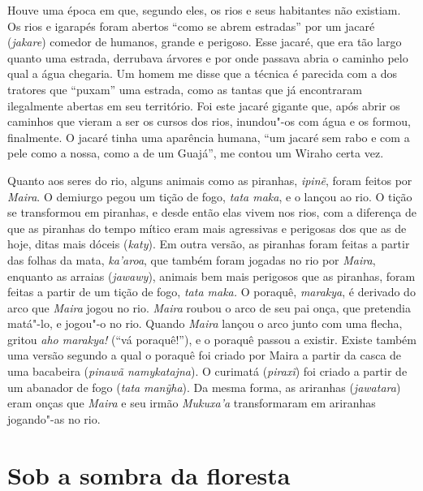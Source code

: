 Houve uma época em que, segundo eles, os rios e seus habitantes não
existiam. Os rios e igarapés foram abertos ``como se abrem estradas'' por
um jacaré (\emph{jakare}) comedor de humanos, grande e perigoso. Esse
jacaré, que era tão largo quanto uma estrada, derrubava árvores e por
onde passava abria o caminho pelo qual a água chegaria. Um homem me
disse que a técnica é parecida com a dos tratores que ``puxam'' uma
estrada, como as tantas que já encontraram ilegalmente abertas em seu
território. Foi este jacaré gigante que, após abrir os caminhos que
vieram a ser os cursos dos rios, inundou"-os com água e os formou,
finalmente. O jacaré tinha uma aparência humana, ``um jacaré sem rabo e
com a pele como a nossa, como a de um Guajá'', me contou um Wiraho certa
vez.

Quanto aos seres do rio, alguns animais como as piranhas, \emph{ipinẽ},
foram feitos por \emph{Maira}. O demiurgo pegou um tição de fogo,
\emph{tata maka}, e o lançou ao rio. O tição se transformou em piranhas,
e desde então elas vivem nos rios, com a diferença de que as piranhas do
tempo mítico eram mais agressivas e perigosas dos que as de hoje, ditas
mais dóceis (\emph{katy}). Em outra versão, as piranhas foram feitas a
partir das folhas da mata, \emph{ka'aroa}, que também foram jogadas no
rio por \emph{Maira}, enquanto as arraias (\emph{jawawy}), animais bem
mais perigosos que as piranhas, foram feitas a partir de um tição de
fogo, \emph{tata maka.} O poraquê, \emph{marakya}, é derivado do arco
que \emph{Maira} jogou no rio. \emph{Maira} roubou o arco de seu pai
onça, que pretendia matá"-lo, e jogou"-o no rio. Quando \emph{Maira}
lançou o arco junto com uma flecha, gritou \emph{aho marakya!} (``vá
poraquê!''), e o poraquê passou a existir. Existe também uma versão
segundo a qual o poraquê foi criado por Maira a partir da casca de uma
bacabeira (\emph{pinawã namykatajna}). O curimatá (\emph{piraxĩ}) foi
criado a partir de um abanador de fogo (\emph{tata} \emph{manỹha}). Da
mesma forma, as ariranhas (\emph{jawatara}) eram onças que \emph{Maira}
e seu irmão \emph{Mukuxa'a} transformaram em ariranhas jogando"-as no
rio.

\section{Sob a sombra da floresta }\label{sob-a-sombra-da-floresta}

